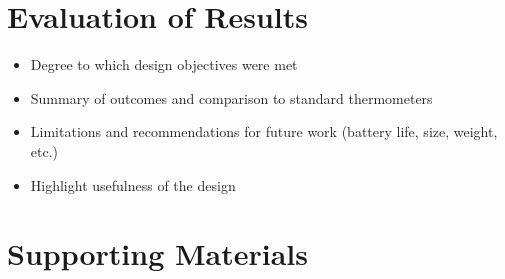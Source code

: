 \documentclass[10pt]{article} \usepackage[margin=1in]{geometry}
\begin{document}
\section{Evaluation of Results} \begin{itemize} \item Degree to which design
	      objectives were met \item Summary of outcomes and comparison to standard
	      thermometers \item Limitations and recommendations for future work (battery
	      life, size, weight, etc.) \item Highlight usefulness of the design \end{itemize}

\appendix \section{Supporting Materials}
\noindent
\end{document}
